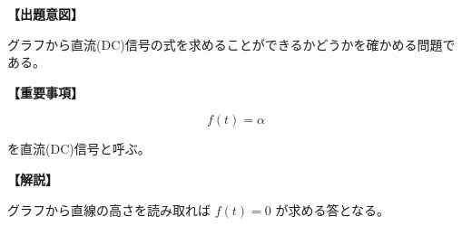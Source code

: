 \noindent \textbf{【出題意図】}

\noindent グラフから直流(DC)信号の式を求めることができるかどうかを確かめる問題である。

\vspace{1em}
\noindent \textbf{【重要事項】}

\[
f(t) = \alpha
\]

\medskip
\noindent を直流(DC)信号と呼ぶ。


\vspace{1em}
\noindent \textbf{【解説】}

\noindent グラフから直線の高さを読み取れば $f(t) = 0$ が求める答となる。
